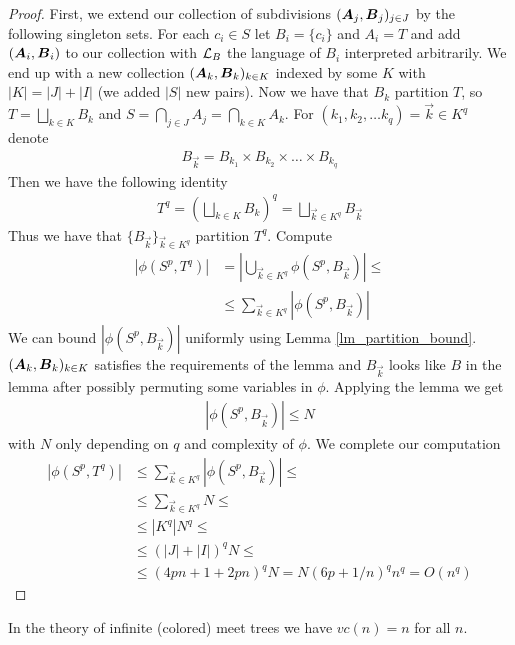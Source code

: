 \documentclass{amsart}
\DeclareMathOperator{\A}{\boldface A}
\DeclareMathOperator{\B}{\boldface B}
\begin{document}
\begin{proof}
	First, we extend our collection of subdivisions $(\A_j, \B_j)_{j \in J}$ by the following singleton sets. For each $c_i \in S$ let $B_i = \{c_i\}$ and $A_i = T$ and add $(\A_i, \B_i)$ to our collection with $\mathcal L_B$ the language of $B_i$ interpreted arbitrarily. We end up with a new collection $(\A_k, \B_k)_{k \in K}$ indexed by some $K$ with $|K| = |J| + |I|$ (we added $|S|$ new pairs). Now we have that $B_k$ partition $T$, so $T = \bigsqcup_{k \in K} B_k$ and $S = \bigcap_{j \in J} A_j = \bigcap_{k \in K} A_k$. For $(k_1, k_2, \ldots k_q) = \vec k \in K^q$ denote 
	\begin{align*}
		B_{\vec k} = B_{k_1} \times B_{k_2} \times \ldots \times B_{k_q}
	\end{align*}
	Then we have the following identity
	\begin{align*}
		T^q = (\bigsqcup_{k \in K} B_k)^q = \bigsqcup_{\vec k \in K^q} B_{\vec k}
	\end{align*}
	Thus we have that $\{B_{\vec k}\}_{\vec k \in K^q}$ partition $T^q$. Compute
	\begin{align*}
		|\phi(S^p, T^q)|
		&= \left|\bigcup_{\vec k \in K^q} \phi(S^p, B_{\vec k}) \right| \leq \\
		&\leq \sum_{\vec k \in K^q} |\phi(S^p, B_{\vec k})|
	\end{align*}
	We can bound $|\phi(S^p, B_{\vec k})|$ uniformly using Lemma \ref{lm_partition_bound}. $(\A_k, \B_k)_{k \in K}$ satisfies the requirements of the lemma and $B_{\vec k}$ looks like $B$ in the lemma after possibly permuting some variables in $\phi$. Applying the lemma we get
	\begin{align*}
		|\phi(S^p, B_{\vec k})| \leq N
	\end{align*}
	with $N$ only depending on $q$ and complexity of $\phi$. We complete our computation
	\begin{align*}
		|\phi(S^p, T^q)|
		&\leq \sum_{\vec k \in K^q} |\phi(S^p, B_{\vec k})| \leq \\
		&\leq \sum_{\vec k \in K^q} N \leq \\
		&\leq |K^q| N^q \leq \\
		&\leq (|J| + |I|)^q N \leq \\
		&\leq (4pn + 1 + 2pn)^q N = N (6p + 1/n)^q n^q = O(n^q)
	\end{align*}
	\end{proof}
	\begin{Corollary}
		In the theory of infinite (colored) meet trees we have $vc(n) = n$ for all $n$.
	\end{Corollary}
\end{document}
